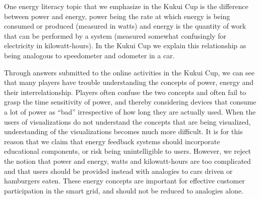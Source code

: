 \documentclass[10pt, conference, compsocconf]{IEEEtran}
\begin{document}
One energy literacy topic that we emphasize in the Kukui Cup is the difference between power and energy, power being the rate at which energy is being consumed or produced (measured in watts) and energy is the quantity of work that can be performed by a system (measured somewhat confusingly for electricity in kilowatt-hours). In the Kukui Cup we explain this relationship as being analogous to speedometer and odometer in a car.

Through answers submitted to the online activities in the Kukui Cup, we can see that many players have trouble understanding the concepts of power, energy and their interrelationship. Players often confuse the two concepts and often fail to grasp the time sensitivity of power, and thereby considering devices that consume a lot of power as ``bad'' irrespective of how long they are actually used. When the users of visualizations do not understand the concepts that are being visualized, understanding of the visualizations becomes much more difficult. It is for this reason that we claim that energy feedback systems should incorporate educational components, or risk being unintelligible to users. However, we reject the notion that power and energy, watts and kilowatt-hours are too complicated and that users should be provided instead with analogies to cars driven or hamburgers eaten. These energy concepts are important for effective customer participation in the smart grid, and should not be reduced to analogies alone.

\end{document}
